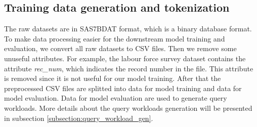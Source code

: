 \subsection{Training data generation and tokenization}
\label{subsection:training_data_gen}
The raw datasets are in SAS7BDAT format, which is a binary database format. To make data processing easier for the downstream model training and evaluation, we convert all raw datasets to CSV files. Then we remove some unuseful attributes. For example, the labour force survey dataset contains the attribute \emph{rec\_num}, which indicates the record number in the file. This attribute is removed since it is not useful for our model training. After that the preprocessed CSV files are splitted into data for model training and data for model evaluation. Data for model evaluation are used to generate query workloads. More details about the query workloads generation will be presented in subsection \ref{subsection:query_workload_gen}.

